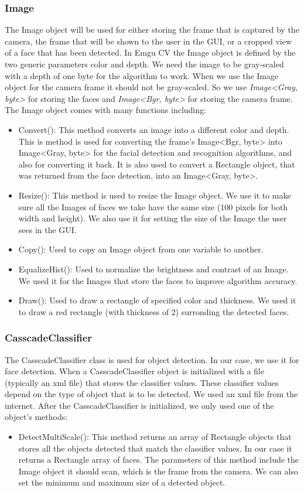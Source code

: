 \documentclass[12pt, a4paper]{article}
\begin{document}
\subsubsection{Image}
The Image object will be used for either storing the frame that is captured by the camera, the frame that will be shown to the user in the GUI, or a cropped view of a face that has been detected.  In Emgu CV the Image object is defined by the two generic parameters color and depth. We need the image to be gray-scaled with a depth of one byte for the algorithm to work. When we use the Image object for the camera frame it should not be gray-scaled. So we use \textit{Image\textless Gray, byte\textgreater} for storing the faces and \textit{Image\textless Bgr, byte\textgreater} for storing the camera frame. The Image object comes with many functions including:
\begin{itemize}
\item Convert(): This method converts an image into a different color and depth. This is method is used for converting the frame’s Image<Bgr, byte> into Image<Gray, byte> for the facial detection and recognition algorithms, and also for converting it back. It is also used to convert a Rectangle object, that was returned from the face detection, into an Image<Gray, byte>.
\item Resize(): This method is used to resize the Image object. We use it to make sure all the Images of faces we take have the same size (100 pixels for both width and height). We also use it for setting the size of the Image the user sees in the GUI.
\item Copy(): Used to copy an Image object from one variable to another.
\item EqualizeHist(): Used to normalize the brightness and contrast of an Image. We used it for the Images that store the faces to improve algorithm accuracy.
\item Draw(): Used to draw a rectangle of specified color and thickness. We used it to draw a red rectangle (with thickness of 2) surronding the detected faces.
\end{itemize}
\subsubsection{CasscadeClassifier} The CasscadeClassifier class is used for object detection. In our case, we use it for face detection. When a CasscadeClassifier object is initialized with a file (typically an xml file) that stores the classifier values. These classifier values depend on the type of object that is to be detected. We used an xml file from the internet. After the CasscadeClassifier is initialized, we only used one of the object’s methods:
\begin{itemize}
\item DetectMultiScale(): This method returns an array of Rectangle objects that stores all the objects detected that match the classifier values. In our case it returns a Rectangle array of faces. The parameters of this method include the Image object it should scan, which is the frame from the camera. We can also set the minimum and maximum size of a detected object.
\end{itemize}
\end{document}
